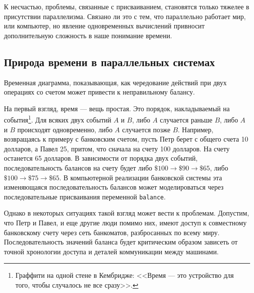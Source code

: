 К несчастью, проблемы, связанные с присваиванием, становятся
только тяжелее в присутствии параллелизма.  Связано ли это с тем, что
параллельно работает мир, или компьютер, но явление одновременных
вычислений привносит дополнительную сложность в наше понимание
времени.

\subsection{Природа времени в параллельных системах}
\label{THE-NATURE-OF-TIME-IN-CONCURRENT-SYSTEMS}

\begin{cntrfig}

\caption{Временная диаграмма, показывающая, как
чередование действий при двух операциях со счетом может привести
к неправильному балансу. }
\label{P3.29}

\end{cntrfig}


На первый взгляд,  время --- вещь простая.
Это порядок, накладываемый на события\footnote{Граффити на одной стене в Кембридже:  <<Время --- это
устройство для того, чтобы случалось не все сразу>>.
}.
Для всяких двух событий $A$ и $B$, либо
$A$ случается раньше $B$, либо $A$ и
$B$ происходят одновременно, либо $A$ случается
позже $B$.  Например, возвращаясь к примеру с банковским
счетом, пусть Петр берет с общего счета 10 долларов, а Павел 25, притом, что
сначала на счету 100 долларов.  На счету останется 65 долларов. В
зависимости от порядка двух событий, последовательность балансов на
счету будет либо $\$100 \to \$90 \to \$65$, либо
$\$100 \to \$75 \to \$65$.  В компьютерной реализации
банковской системы эта изменяющаяся последовательность балансов может
моделироваться через последовательные присваивания переменной
{\tt balance}.

Однако в некоторых ситуациях такой взгляд может вести к
проблемам.  Допустим, что Петр и Павел, и еще другие люди помимо них,
имеют доступ к  
совместному банковскому счету через сеть банкоматов,
разбросанных по всему миру.  Последовательность значений баланса
будет критическим образом зависеть от точной хронологии доступа и деталей
коммуникации между машинами.

